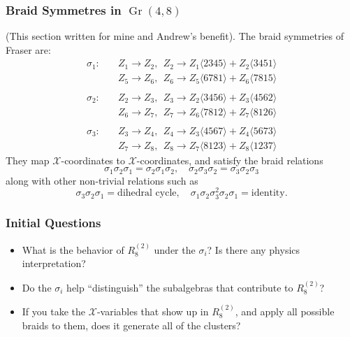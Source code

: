 \documentclass[12pt]{article}
\DeclareMathOperator{\Gr}{Gr}
\def\x{\mathcal{X}}
\def\ket#1{\langle #1 \rangle}
\begin{document}
\subsubsection*{Braid Symmetres in $\Gr(4,8)$}
(This section written for mine and Andrew's benefit).
The braid symmetries of Fraser are:
\begin{align}
	\sigma_1: \quad&Z_1 \to Z_2,~~ Z_2 \to Z_1 \ket{2345} + Z_2\ket{3451}\\
			&Z_5 \to Z_6,~~ Z_6 \to Z_5 \ket{6781} + Z_6\ket{7815}\nonumber \\ \nonumber \\
	\sigma_2: \quad&Z_2 \to Z_3,~~ Z_3 \to Z_2 \ket{3456} + Z_3\ket{4562}\\
			&Z_6 \to Z_7,~~ Z_7 \to Z_6 \ket{7812} + Z_7\ket{8126}\nonumber \\  \nonumber \\
	\sigma_3: \quad&Z_3 \to Z_4,~~ Z_4 \to Z_3 \ket{4567} + Z_4\ket{5673}\\
			&Z_7 \to Z_8,~~ Z_8 \to Z_7 \ket{8123} + Z_8\ket{1237}\nonumber
\end{align}
They map $\x$-coordinates to $\x$-coordinates, and satisfy the braid relations
\begin{equation}
	\sigma_1\sigma_2\sigma_1=\sigma_2\sigma_1\sigma_2,\quad \sigma_2\sigma_3\sigma_2=\sigma_3\sigma_2\sigma_3
\end{equation}
along with other non-trivial relations such as 
\begin{equation}
	\sigma_3 \sigma_2 \sigma_1 = \text{dihedral cycle}, \quad \sigma_1 \sigma_2 \sigma_3^2 \sigma_2 \sigma_1 = \text{identity}.
\end{equation}
\subsubsection*{Initial Questions}

\begin{itemize}
	\item What is the behavior of $R^{(2)}_8$ under the $\sigma_i$? Is there any physics interpretation?
	\item Do the $\sigma_i$ help ``distinguish'' the subalgebras that contribute to $R^{(2)}_8$?
	\item If you take the $\x$-variables that show up in $R^{(2)}_8$, and apply all possible braids to them, does it generate all of the clusters?
\end{itemize}
\end{document}
